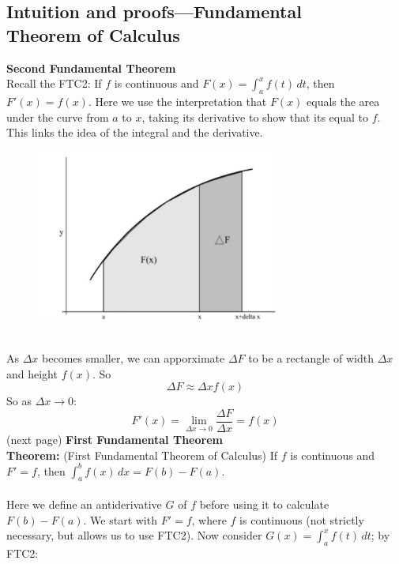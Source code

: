 \documentclass{report}
\begin{document}
\subsection{Intuition and proofs---Fundamental\\Theorem of Calculus} %
\label{fundamentals:integrals:FTC_proof}
\textbf{Second Fundamental Theorem}\\
Recall the FTC2: If $f$ is continuous and 
$F(x)=\int_{a}^xf(t)\,dt$, then $F'(x)=f(x)$. Here we use the interpretation 
that $F(x)$ equals the area under the curve from $a$ to $x$, taking its derivative 
to show that its equal to $f$. This links the idea of the integral and the derivative.
\begin{figure}[h]
\includegraphics[width=8cm]{Capture31}\\
\centering
{}
\end{figure}\\
As $\Delta x$ becomes smaller, we can apporximate $\Delta F$ to be a rectangle of 
width $\Delta x$ and height $f(x)$. So
\begin{equation*}
\Delta F\approx \Delta xf(x)
\end{equation*}
So as $\Delta x\to0$:
\begin{equation*}
F'(x)=\lim_{\Delta x\to0}\frac{\Delta F}{\Delta x}=f(x)
\end{equation*}
(next page)
\newpage
\noindent\textbf{First Fundamental Theorem}\\
\textbf{Theorem:} (First Fundamental Theorem of Calculus) If $f$ is continuous and
$F'=f$, then $\int_a^bf(x)\,dx=F(b)-F(a)$.\\
\vspace{1mm}\\
Here we define an antiderivative $G$ of $f$ before using it to calculate
$F(b)-F(a)$. We start with $F'=f$, where $f$ is continuous (not strictly necessary, but 
allows us to use FTC2). Now consider $G(x)=\int_a^xf(t)\,dt$; by FTC2:
\end{document}

